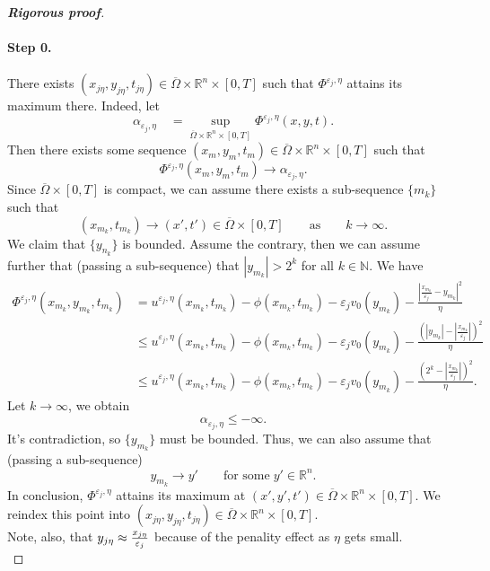 \documentclass[12pt, oneside]{amsart}  	%
\begin{document}
\begin{proof}[\textbf{Rigorous proof}]
\paragraph{\textbf{Step 0.}} There exists $\left(x_{j\eta},y_{j\eta},t_{j\eta}\right)\in \overline{\Omega}\times\mathbb{R}^n\times [0,T]$ such that $\Phi^{\varepsilon_j,\eta}$ attains its maximum there. Indeed, let
\begin{equation*}
\alpha_{\varepsilon_j,\eta}\quad  = \sup_{ \overline{\Omega}\times\mathbb{R}^n\times [0,T]} \Phi^{\varepsilon_j,\eta} (x,y,t).
\end{equation*}
Then there exists some sequence $(x_m,y_m,t_m)\in \overline{\Omega}\times\mathbb{R}^n\times [0,T]$ such that 
\begin{equation*}
\Phi^{\varepsilon_j, \eta}(x_m,y_m,t_m)\longrightarrow \alpha_{\varepsilon_j,\eta}.
\end{equation*}
Since $\overline{\Omega}\times [0,T]$ is compact, we can assume there exists a sub-sequence $\{m_k\}$ such that $$\left(x_{m_k},t_{m_k}\right) \longrightarrow (x',t')\in \overline{\Omega}\times[0,T]\qquad\text{as}\qquad k\longrightarrow\infty.$$
We claim that $\{y_{n_k}\}$ is bounded. Assume the contrary, then we can assume further that (passing a sub-sequence) that $\left|y_{m_k}\right| > 2^k$ for all $k\in \mathbb{N}$. We have
\begin{align*}
\Phi^{\varepsilon_j,\eta}\left(x_{m_k},y_{m_k},t_{m_k}\right) &= u^{\varepsilon_j,\eta}\left(x_{m_k},t_{m_k}\right) - \phi\left(x_{m_k},t_{m_k}\right) - \varepsilon_jv_0\left(y_{m_k}\right) - \frac{\left|\frac{x_{m_k}}{\varepsilon_j} - y_{m_k}\right|^2}{\eta}\\
&\leq u^{\varepsilon_j,\eta}\left(x_{m_k},t_{m_k}\right) - \phi\left(x_{m_k},t_{m_k}\right) - \varepsilon_jv_0\left(y_{m_k}\right) - \frac{\left( \left|y_{m_k}\right| - \left|\frac{x_{m_k}}{\varepsilon_j}\right|   \right)^2}{\eta}\\
&\leq u^{\varepsilon_j,\eta}\left(x_{m_k},t_{m_k}\right) - \phi\left(x_{m_k},t_{m_k}\right) - \varepsilon_jv_0\left(y_{m_k}\right) - \frac{\left( 2^k - \left|\frac{x_{m_k}}{\varepsilon_j}\right|   \right)^2}{\eta}.
\end{align*}
Let $k\longrightarrow\infty$, we obtain
\begin{equation*}
\alpha_{\varepsilon_j,\eta} \leq -\infty.
\end{equation*}
It's contradiction, so $\{y_{m_k}\}$ must be bounded. Thus, we can also assume that (passing a sub-sequence)
\begin{equation*}
y_{m_k} \longrightarrow y' \qquad\text{for some}\;y'\in \mathbb{R}^n.
\end{equation*}
In conclusion, $\Phi^{\varepsilon_j,\eta}$ attains its maximum at $(x',y',t') \in \overline{\Omega} \times \mathbb{R}^n\times [0,T]$. We reindex this point into $\left(x_{j\eta},y_{j\eta},t_{j\eta}\right)\in \overline{\Omega}\times\mathbb{R}^n\times [0,T]$.\\
Note, also, that $y_{j\eta}\approx \frac{x_{j\eta}}{\varepsilon_j}$ because of the penality effect as $\eta$ gets small.\\


\end{proof}
\end{document}
